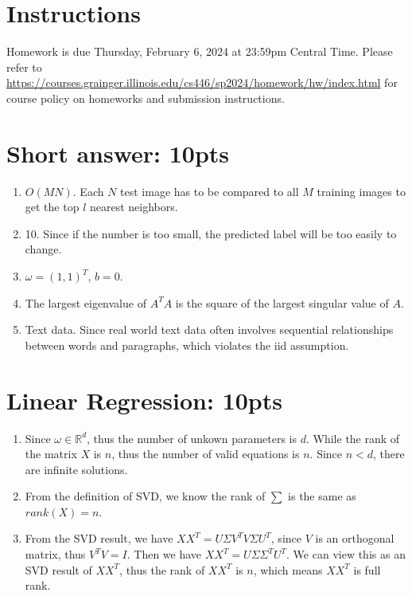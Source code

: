 \documentclass[12pt]{article}
\begin{document}
\singlespacing

\renewcommand{\familydefault}{\rmdefault}


\section{Instructions}

Homework is due Thursday, February 6, 2024 at 23:59pm Central Time.
Please refer to \url{https://courses.grainger.illinois.edu/cs446/sp2024/homework/hw/index.html} for course policy on homeworks and submission instructions.

\section{Short answer: 10pts}
\begin{enumerate}
\item $O(MN)$. Each $N$ test image has to be compared to all $M$ training images to get the top $l$ nearest neighbors.
\item 10. Since if the number is too small, the predicted label will be too easily to change.
\item $\omega = (1, 1)^{T}$, $b = 0$. 
\item The largest eigenvalue of $A^{T}A$ is the square of the largest singular value of $A$.
\item Text data. Since real world text data often involves sequential relationships between words and paragraphs, which violates the iid assumption.
\end{enumerate}

\section{Linear Regression: 10pts}
\begin{enumerate}
\item Since $\omega \in \mathbb{R} ^{d}$, thus the number of unkown parameters is $d$. While the rank of the matrix $X$ is $n$, thus the number of valid equations is $n$. Since $n < d$, there are infinite solutions.
\item From the definition of SVD, we know the rank of $\sum $ is the same as $rank(X)=n$. 
\item From the SVD result, we have $XX^{T} = U\Sigma V^{T}V \Sigma U^{T}$, since $V$ is an orthogonal matrix, thus $V^{T}V = I$. Then we have $XX^{T} = U\Sigma\Sigma^{T} U^{T}$. We can view this as an SVD result of $XX^{T}$, thus the rank of $XX^{T}$ is $n$, which means $XX^{T}$ is full rank.
\end{enumerate}
\end{document}
